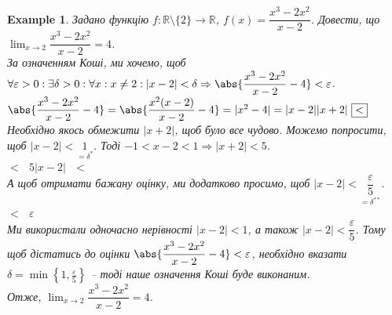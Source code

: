 \documentclass[a4paper, 14pt]{article}
\theoremstyle{theoremdd}
\theoremstyle{theoremdd}
\theoremstyle{theoremdd}
\theoremstyle{theoremdd}
\newtheorem{example}[theorem]{Example}
\theoremstyle{theoremdd}
\theoremstyle{theoremdd}
\theoremstyle{theoremdd}
\theoremstyle{theoremdd}
\begin{document}
	\begin{example}
	Задано функцію $f \colon \mathbb{R} \setminus \{2\} \to \mathbb{R}$, $f(x) = \dfrac{x^3-2x^2}{x-2}$. Довести, що $\displaystyle \lim_{x \to 2} \dfrac{x^3-2x^2}{x-2} = 4$.\\
	За означенням Коші, ми хочемо, щоб $\forall \varepsilon > 0: \exists \delta > 0: \forall x: x \neq 2: |x-2|<\delta \Rightarrow \abs{\dfrac{x^3-2x^2}{x-2} - 4} <\varepsilon$.
\\ %
	$\abs{\dfrac{x^3-2x^2}{x-2} - 4} = \abs{\dfrac{x^2(x-2)}{x-2} - 4} = |x^2-4| = |x-2||x+2| \text{ } \boxed{<}$\\
	Необхідно якось обмежити $|x+2|$, щоб було все чудово. Можемо попросити, щоб $|x-2| < \underset{=\delta^*}{1}$. Тоді $-1<x-2<1 \Rightarrow |x+2|<5$.\\
	$\boxed{<} \text{ } 5|x-2| \text{ } \boxed{\boxed{<}}$\\
	А щоб отримати бажану оцінку, ми додатково просимо, щоб $|x-2| < \underset{=\delta^{**}}{\dfrac{\varepsilon}{5}}$.\\
	$\boxed{\boxed{<}} \text{ } \varepsilon$\\
	Ми використали одночасно нерівності $|x-2| < 1$, а також $|x-2| < \dfrac{\varepsilon}{5}$. Тому щоб дістатись до оцінки $\abs{\dfrac{x^3-2x^2}{x-2}-4}<\varepsilon$, необхідно вказати $\delta = \displaystyle \min \left\{1, \frac{\varepsilon}{5} \right\}$ -- тоді наше означення Коші буде виконаним.\\
	Отже, $\displaystyle\lim_{x \to 2} \dfrac{x^3-2x^2}{x-2} = 4$.
\end{example}
\end{document}
